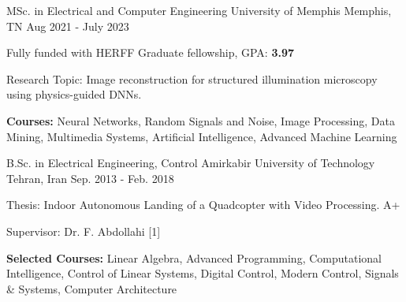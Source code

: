 

\begin{cventries}

  \cventry
    {MSc. in Electrical and Computer Engineering} %
    {University of Memphis} %
    {Memphis, TN} %
    {Aug 2021 - July 2023} %
    {
      \begin{cvitems} %
        \item {Fully funded with HERFF Graduate fellowship, GPA:\textbf{ 3.97}}
        \item {Research Topic: Image reconstruction for structured illumination microscopy using physics-guided DNNs.}
        \item {\textbf{Courses:} Neural Networks, Random Signals and Noise, Image Processing, Data Mining, Multimedia Systems, Artificial Intelligence, Advanced Machine Learning}
      \end{cvitems}
    }
    
  \cventry
    {B.Sc. in Electrical Engineering, Control} %
    {Amirkabir University of Technology} %
    {Tehran, Iran} %
    {Sep. 2013 - Feb. 2018} %
    {
      \begin{cvitems} %
        \item {Thesis: Indoor Autonomous Landing of a Quadcopter with Video Processing. A+} 
        \item {Supervisor: Dr. F. Abdollahi [1]} 
        \item {\textbf{Selected Courses:} Linear Algebra, Advanced Programming, Computational Intelligence, Control of Linear Systems, Digital Control, Modern Control, Signals \& Systems, Computer Architecture}
      \end{cvitems}
        }
    

\end{cventries}
